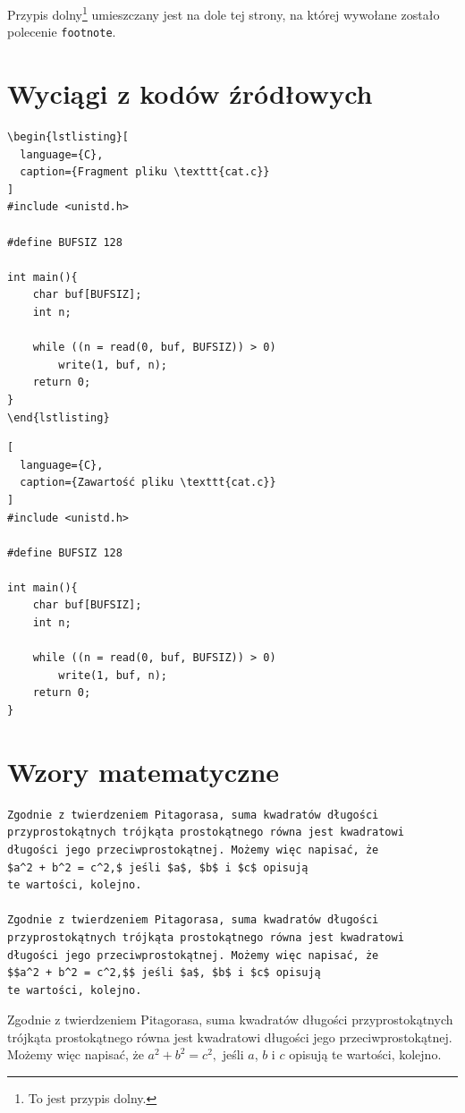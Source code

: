 \documentclass[oneside]{amuthesis}
\begin{document}
\noindent Przypis dolny\footnote{To jest przypis dolny.} umieszczany
jest na dole tej strony, na której wywołane zostało
polecenie \texttt{footnote}.

\section{Wyciągi z kodów źródłowych}

\begin{verbatim}
\begin{lstlisting}[
  language={C},
  caption={Fragment pliku \texttt{cat.c}}
]
#include <unistd.h>

#define BUFSIZ 128

int main(){
    char buf[BUFSIZ];
    int n;

    while ((n = read(0, buf, BUFSIZ)) > 0)
        write(1, buf, n);
    return 0;
}
\end{lstlisting}
\end{verbatim}

\begin{lstlisting}[
  language={C},
  caption={Zawartość pliku \texttt{cat.c}}
]
#include <unistd.h>

#define BUFSIZ 128

int main(){
    char buf[BUFSIZ];
    int n;

    while ((n = read(0, buf, BUFSIZ)) > 0)
        write(1, buf, n);
    return 0;
}
\end{lstlisting}

\section{Wzory matematyczne}

\begin{verbatim}
Zgodnie z twierdzeniem Pitagorasa, suma kwadratów długości
przyprostokątnych trójkąta prostokątnego równa jest kwadratowi
długości jego przeciwprostokątnej. Możemy więc napisać, że
$a^2 + b^2 = c^2,$ jeśli $a$, $b$ i $c$ opisują
te wartości, kolejno.

Zgodnie z twierdzeniem Pitagorasa, suma kwadratów długości
przyprostokątnych trójkąta prostokątnego równa jest kwadratowi
długości jego przeciwprostokątnej. Możemy więc napisać, że
$$a^2 + b^2 = c^2,$$ jeśli $a$, $b$ i $c$ opisują
te wartości, kolejno.
\end{verbatim}

\noindent Zgodnie z twierdzeniem Pitagorasa, suma kwadratów długości
przyprostokątnych trójkąta prostokątnego równa jest kwadratowi
długości jego przeciwprostokątnej. Możemy więc napisać, że
$a^2 + b^2 = c^2,$ jeśli $a$, $b$ i $c$ opisują
te wartości, kolejno.
\end{document}
